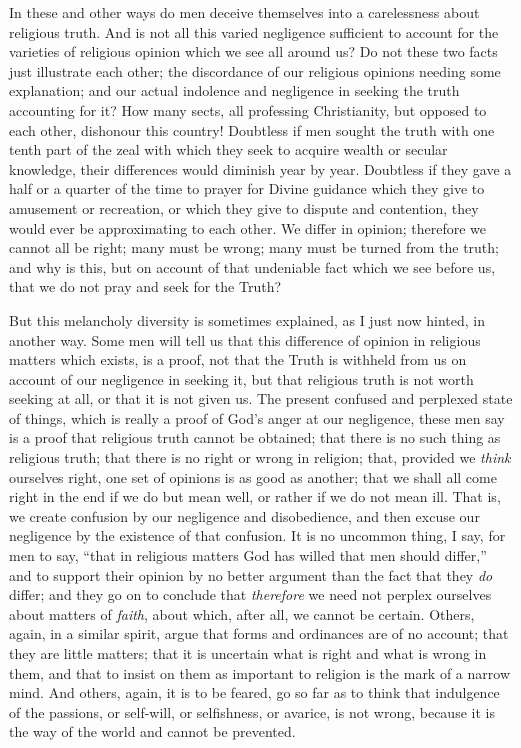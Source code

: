 In these and other ways do men deceive themselves into a
carelessness about religious truth. And is not all this varied
negligence sufficient to account for the varieties of religious
opinion which we see all around us? Do not these two facts just
illustrate each other; the discordance of our religious opinions
needing some explanation; and our actual indolence and negligence in
seeking the truth accounting for it? How many sects, all professing
Christianity, but opposed to each other, dishonour this country!
Doubtless if men sought the truth with one tenth part of the zeal with
which they seek to acquire wealth or secular knowledge, their
differences would diminish year by year. Doubtless if they gave a half
or a quarter of the time to prayer for Divine guidance which they give
to amusement or recreation, or which they give to dispute and
contention, they would ever be approximating to each other. We differ
in opinion; therefore we cannot all be right; many must be wrong; many
must be turned from the truth; and why is this, but on account of that
undeniable fact which we see before us, that we do not pray and seek
for the Truth?

But this melancholy diversity is sometimes explained, as I just now
hinted, in another way. Some men will tell us that this difference of
opinion in religious matters which exists, is a proof, not that the
Truth is withheld from us on account of our negligence in seeking it,
but that religious truth is not worth seeking at all, or that it is
not given us. The present confused and perplexed state of things,
which is really a proof of God's anger at our negligence, these men
say is a proof that religious truth cannot be obtained; that there is
no such thing as religious truth; that there is no right or wrong in
religion; that, provided we \emph{think} ourselves right, one set of
opinions is as good as another; that we shall all come right in the
end if we do but mean well, or rather if we do not mean ill. That is,
we create confusion by our negligence and disobedience, and then
excuse our negligence by the existence of that confusion. It is no
uncommon thing, I say, for men to say, ``that in religious matters
God has willed that men should differ,'' and to support their
opinion by no better argument than the fact that they \emph{do}
differ; and they go on to conclude that \emph{therefore} we need not
perplex ourselves about matters of \emph{faith}, about which, after
all, we cannot be certain. Others, again, in a similar spirit, argue
that forms and ordinances are of no account; that they are little
matters; that it is uncertain what is right and what is wrong in them,
and that to insist on them as important to religion is the mark of a
narrow mind. And others, again, it is to be feared, go so far as to
think that indulgence of the passions, or self-will, or selfishness,
or avarice, is not wrong, because it is the way of the world and
cannot be prevented.

